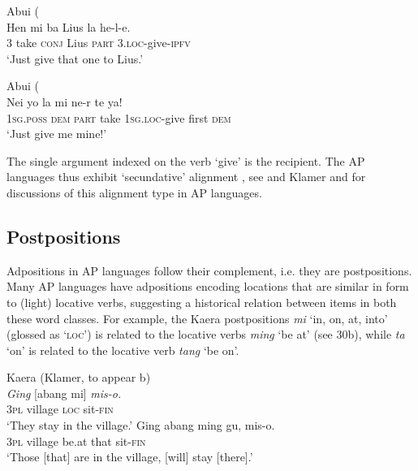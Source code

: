 \ea%
\label{ex:28}
Abui (\citep[Kratochv\'il, Abui corpus; cited in][]{KlamerEtAl2012}   \\
\gll Hen  mi  ba  Lius  la   he-l-e. \\
3  take  \textsc{conj} Lius  \textsc{part} 3.\textsc{loc}{}-give-\textsc{ipfv}   \\
\glt `Just give that one to Lius.'
\z









\ea%
\label{ex:29}
Abui (\citep[Kratochv\'il, Abui corpus; cited in][]{KlamerEtAl2012}   \\
\gll Nei  yo  la  mi  ne-r  te  ya! \\
\textsc{1sg.poss}  \textsc{dem}  \textsc{part} take  1\textsc{sg.loc}{}-give  first  \textsc{dem}    \\
\glt `Just give me mine!'
\z

The single argument indexed on the verb `give' is the recipient. The AP languages thus exhibit `secundative' alignment \citep{Dryer1986}, see \citet{Klamer2010b} and Klamer and \citet{Schapper2012} for discussions of this alignment type in AP languages.

\subsection{Postpositions}
Adpositions in AP languages follow their complement, i.e. they are postpositions. Many AP languages have adpositions encoding locations that are similar in form to (light) locative verbs, suggesting a historical relation between items in both these word classes. For example, the Kaera postpositions \textit{mi} `in, on, at, into' (glossed as `\textsc{loc')}  is related to the locative verbs \textit{ming} `be at' (see 30b), while \textit{ta} `on' is related to the locative verb \textit{tang} `be on'.



\ea%
\label{ex:30}
\ea
 Kaera (Klamer, to appear b)  \\
\gll \textit{Ging} [abang  mi]  \textit{mis-o.}  \\
  \textsc{3pl} village  \textsc{loc} sit-\textsc{fin}  \\
\glt `They stay in the village.'
\ex
\gll Ging  abang   ming  gu,   mis-o. \\
\textsc{3pl} village  be.at  that  sit-\textsc{fin}   \\
\glt `Those [that] are in the village, [will] stay [there].'
\z\z




